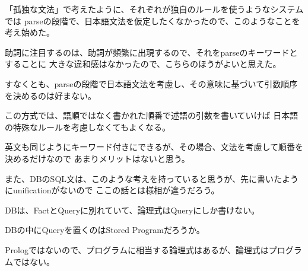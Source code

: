 \documentclass[10pt, oneside]{jarticle}   	%
\begin{document}
「孤独な文法」で考えたように、それぞれが独自のルールを使うようなシステムでは
parseの段階で、日本語文法を仮定したくなかったので、このようなことを考え始めた。

助詞に注目するのは、助詞が頻繁に出現するので、それをparseのキーワードとすることに
大きな違和感はなかったので、こちらのほうがよいと思えた。

すなくとも、parseの段階で日本語文法を考慮し、その意味に基づいて引数順序を決めるのは好まない。

この方式では、語順ではなく書かれた順番で述語の引数を書いていけば
日本語の特殊なルールを考慮しなくてもよくなる。

英文も同じようにキーワード付きにできるが、その場合、文法を考慮して順番を決めるだけなので
あまりメリットはないと思う。

また、DBのSQL文は、このような考えを持っていると思うが、先に書いたようにunificationがないので
ここの話とは様相が違うだろう。

DBは、FactとQueryに別れていて、論理式はQueryにしか書けない。

DBの中にQueryを置くのはStored Programだろうか。

Prologではないので、プログラムに相当する論理式はあるが、論理式はプログラムではない。
\end{document}
